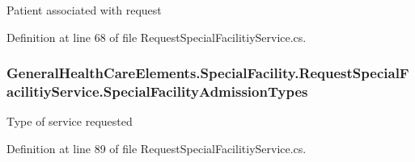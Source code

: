 Patient associated with request 



Definition at line 68 of file Request\+Special\+Facilitiy\+Service.\+cs.

\subsubsection[{\texorpdfstring{Special\+Facility\+Admission\+Types}{SpecialFacilityAdmissionTypes}}]{ General\+Health\+Care\+Elements.\+Special\+Facility.\+Request\+Special\+Facilitiy\+Service.\+Special\+Facility\+Admission\+Types\hspace{0.3cm}{\ttfamily [get]}}\hypertarget{class_general_health_care_elements_1_1_special_facility_1_1_request_special_facilitiy_service_a82d8a831c8df8a6c1b0bf2b96c1008ce}{}\label{class_general_health_care_elements_1_1_special_facility_1_1_request_special_facilitiy_service_a82d8a831c8df8a6c1b0bf2b96c1008ce}


Type of service requested 



Definition at line 89 of file Request\+Special\+Facilitiy\+Service.\+cs.

